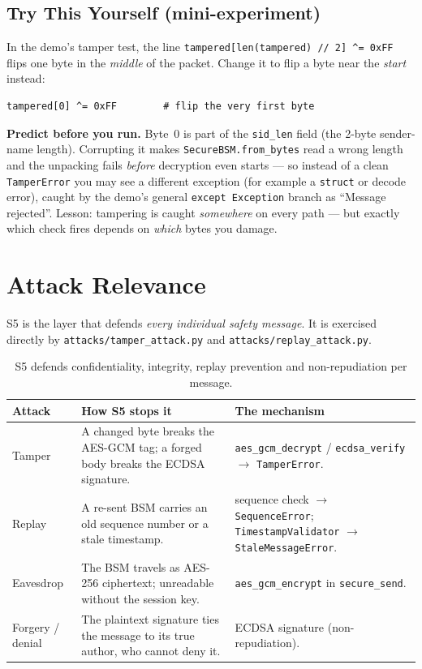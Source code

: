 \documentclass[11pt,a4paper]{report}
\begin{document}
\subsection{Try This Yourself (mini-experiment)}
In the demo's tamper test, the line \texttt{tampered[len(tampered) // 2] \^{}= 0xFF}
flips one byte in the \emph{middle} of the packet. Change it to flip a byte near
the \emph{start} instead:
\begin{lstlisting}[style=term]
tampered[0] ^= 0xFF        # flip the very first byte
\end{lstlisting}
\textbf{Predict before you run.} Byte~0 is part of the \texttt{sid\_len} field
(the 2-byte sender-name length). Corrupting it makes \texttt{SecureBSM.from\_bytes}
read a wrong length and the unpacking fails \emph{before} decryption even starts
--- so instead of a clean \texttt{TamperError} you may see a different exception
(for example a \texttt{struct} or decode error), caught by the demo's general
\texttt{except Exception} branch as ``Message rejected''. Lesson: tampering is
caught \emph{somewhere} on every path --- but exactly which check fires depends
on \emph{which} bytes you damage.

\section{Attack Relevance}

S5 is the layer that defends \emph{every individual safety message}. It is
exercised directly by \texttt{attacks/tamper\_attack.py} and
\texttt{attacks/replay\_attack.py}.

\begin{table}[h]
\centering
\small
\begin{tabular}{@{}p{2.5cm} p{6.1cm} p{4.9cm}@{}}
\toprule
\textbf{Attack} & \textbf{How S5 stops it} & \textbf{The mechanism}\\
\midrule
Tamper & A changed byte breaks the AES-GCM tag; a forged body breaks the ECDSA
signature. & \texttt{aes\_gcm\_decrypt} / \texttt{ecdsa\_verify} $\to$
\texttt{TamperError}.\\
Replay & A re-sent BSM carries an old sequence number or a stale timestamp. &
sequence check $\to$ \texttt{SequenceError}; \texttt{TimestampValidator} $\to$
\texttt{StaleMessageError}.\\
Eavesdrop & The BSM travels as AES-256 ciphertext; unreadable without the
session key. & \texttt{aes\_gcm\_encrypt} in \texttt{secure\_send}.\\
Forgery / denial & The plaintext signature ties the message to its true author,
who cannot deny it. & ECDSA signature (non-repudiation).\\
\bottomrule
\end{tabular}
\caption{S5 defends confidentiality, integrity, replay prevention and non-repudiation per message.}
\end{table}
\end{document}
